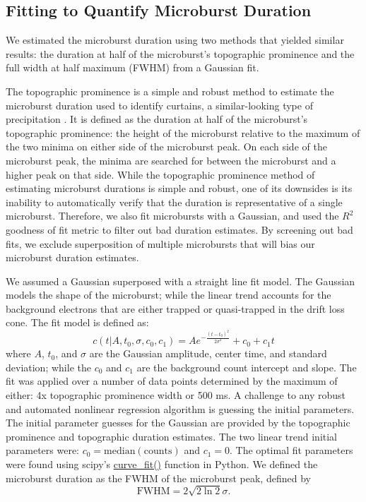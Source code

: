 \documentclass[draft]{agujournal2019}
\begin{document}
\subsection{Fitting to Quantify Microburst Duration}
We estimated the microburst duration using two methods that yielded similar results: the duration at half of the microburst's topographic prominence and the full width at half maximum (FWHM) from a Gaussian fit.

The topographic prominence is a simple and robust method to estimate the microburst duration used to identify curtains, a similar-looking type of precipitation \cite{Shumko2020b}. It is defined as the duration at half of the microburst's topographic prominence: the height of the microburst relative to the maximum of the two minima on either side of the microburst peak. On each side of the microburst peak, the minima are searched for between the microburst and a higher peak on that side. While the topographic prominence method of estimating microburst durations is simple and robust, one of its downsides is its inability to automatically verify that the duration is representative of a single microburst. Therefore, we also fit microbursts with a Gaussian, and used the $R^2$ goodness of fit metric to filter out bad duration estimates. By screening out bad fits, we exclude superposition of multiple microbursts that will bias our microburst duration estimates.

We assumed a Gaussian superposed with a straight line fit model. The Gaussian models the shape of the microburst; while the linear trend accounts for the background electrons that are either trapped or quasi-trapped in the drift loss cone. The fit model is defined as:
\begin{equation}
c(t | A, t_0, \sigma, c_0, c_1) = A e^{-\frac{(t-t_0)^2}{2\sigma^2}} + c_0 + c_1 t
\end{equation} where $A$, $t_0$, and $\sigma$ are the Gaussian amplitude, center time, and standard deviation; while the $c_0$ and $c_1$ are the background count intercept and slope. The fit was applied over a number of data points determined by the maximum of either: 4x topographic prominence width or 500 ms. A challenge to any robust and automated nonlinear regression algorithm is guessing the initial parameters. The initial parameter guesses for the Gaussian are provided by the topographic prominence and topographic duration estimates. The two linear trend initial parameters were: $c_0=\mathrm{median(counts)}$ and $c_1=0$. The optimal fit parameters were found using scipy's \url{curve_fit()} function in Python. We defined the microburst duration as the FWHM of the microburst peak, defined by
\begin{equation}
\mathrm{FWHM} = 2\sqrt{2 \ln{2}} \sigma.
\end{equation}
\end{document}
